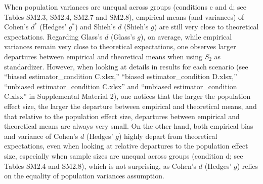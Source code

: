 \documentclass[
  english,
  man,mask,floatsintext]{apa6}
\begin{document}
When population variances are unequal across groups (conditions c and d; see Tables SM2.3, SM2.4, SM2.7 and SM2.8), empirical means (and variances) of Cohen's \(d^*\) (Hedges' \(g^*\)) and Shieh's \(d\) (Shieh's \(g\)) are still very close to theoretical expectations. Regarding Glass's \(d\) (Glass's \(g\)), on average, while empirical variances remain very close to theoretical expectations, one observes larger departures between empirical and theoretical means when using \(S_2\) as standardizer. However, when looking at details in results for each scenario (see ``biased estimator\_condition C.xlsx,'' ``biased estimator\_condition D.xlsx,'' ``unbiased estimator\_condition C.xlsx'' and ``unbiased estimator\_condition C.xlsx'' in Supplemental Material 2), one notices that the larger the population effect size, the larger the departure between empirical and theoretical means, and that relative to the population effect size, departures between empirical and theoretical means are always very small. On the other hand, both empirical bias and variance of Cohen's \(d\) (Hedges' \(g\)) highly depart from theoretical expectations, even when looking at relative departures to the population effect size, especially when sample sizes are unequal across groups (condition d; see Tables SM2.4 and SM2.8), which is not surprising, as Cohen's \(d\) (Hedges' \(g\)) relies on the equality of population variances assumption.
\end{document}
